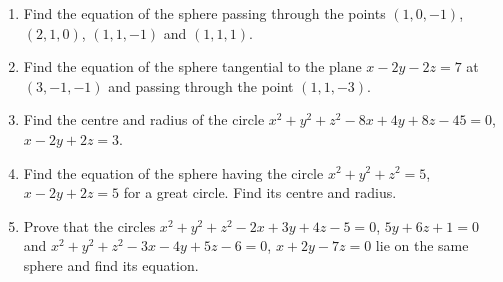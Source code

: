 \documentclass[a4paper,10pt]{article}
\begin{document}
\begin{enumerate}
\item %
Find the equation of the sphere passing through the points $(1, 0, -1)$, $(2, 1, 0)$, $(1, 1, -1)$ and $(1, 1, 1)$.

\item %
Find the equation of the sphere tangential to the plane $x - 2y - 2z = 7$ at $(3, -1, -1)$ and passing through the point $(1, 1, -3)$. 

\item %
Find the centre and radius of the circle $x^2 + y^2 + z^2 - 8x + 4y + 8z - 45 = 0$, $x - 2y + 2z = 3$.

\item %
Find the equation of the sphere having the circle $x^2 + y^2 + z^2 = 5$, $x - 2y + 2z = 5$ for a great circle. Find its centre and radius.

\item %
Prove that the circles $x^2 + y^2 + z^2 - 2x + 3y + 4z - 5 = 0$, $5y + 6z + 1 = 0$ and $x^2 + y^2 + z^2 - 3x - 4y + 5z - 6 = 0$, $x + 2y - 7z = 0$ lie on the same sphere and find its equation.

\end{enumerate}
\end{document}
